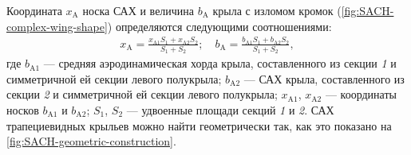 	Координата $x_\mathrm{A}$ носка САХ и величина $b_\mathrm{A}$ крыла с изломом кромок (\cref{fig:SACH-complex-wing-shape}) определяются следующими соотношениями:
	\begin{gather}\label{eq:3.5}
		x_\mathrm{A} = \frac{x_\mathrm{A1}S_1 + x_\mathrm{A2}S_2}{S_1 + S_2};\quad
		b_\mathrm{A} = \frac{b_\mathrm{A1}S_1 + b_\mathrm{A2}S_2}{S_1 + S_2},
	\end{gather}
	где $b_\mathrm{A1}$ --- средняя аэродинамическая хорда крыла, составленного из секции \textit{1} и симметричной ей секции левого полукрыла; $b_\mathrm{A2}$ --- САХ крыла, составленного из секции \textit{2} и симметричной ей секции левого полукрыла; $x_\mathrm{A1}$, $x_\mathrm{A2}$ --- координаты носков $b_\mathrm{A1}$ и $b_\mathrm{A2}$; $S_1$, $S_2$ --- удвоенные площади секций \textit{1} и \textit{2}.\n
	САХ трапециевидных крыльев можно найти геометрически так, как это показано на \cref{fig:SACH-geometric-construction}.
	
